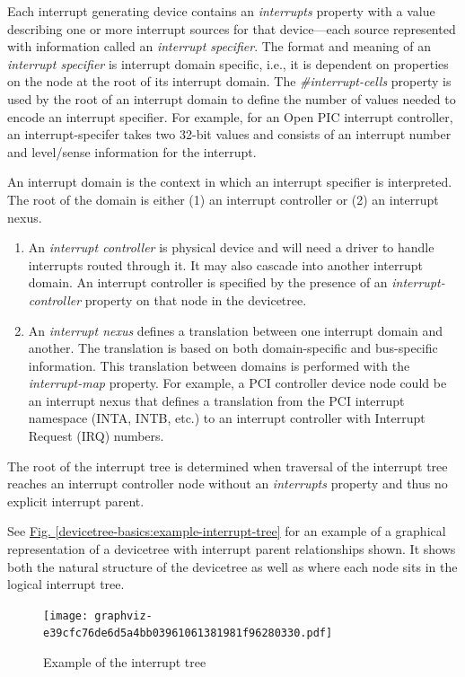\documentclass[a4paper,10pt,oneside]{sphinxmanual}
\begin{document}
Each interrupt generating device contains an \emph{interrupts} property with
a value describing one or more interrupt sources for that device—each
source represented with information called an \emph{interrupt specifier}. The
format and meaning of an \emph{interrupt specifier} is interrupt domain
specific, i.e., it is dependent on properties on the node at the root of
its interrupt domain. The \emph{\#interrupt-cells} property is used by the
root of an interrupt domain to define the number of  values
needed to encode an interrupt specifier. For example, for an Open PIC
interrupt controller, an interrupt-specifer takes two 32-bit values and
consists of an interrupt number and level/sense information for the
interrupt.

An interrupt domain is the context in which an interrupt specifier is
interpreted. The root of the domain is either (1) an interrupt
controller or (2) an interrupt nexus.
\begin{enumerate}
\item {} 
An \emph{interrupt controller} is physical device and will need a driver
to handle interrupts routed through it. It may also cascade into
another interrupt domain. An interrupt controller is specified by the
presence of an \emph{interrupt-controller} property on that node in the
devicetree.

\item {} 
An \emph{interrupt nexus} defines a translation between one interrupt
domain and another. The translation is based on both domain-specific
and bus-specific information. This translation between domains is
performed with the \emph{interrupt-map} property. For example, a PCI
controller device node could be an interrupt nexus that defines a
translation from the PCI interrupt namespace (INTA, INTB, etc.) to an
interrupt controller with Interrupt Request (IRQ) numbers.

\end{enumerate}

The root of the interrupt tree is determined when traversal of the
interrupt tree reaches an interrupt controller node without an
\emph{interrupts} property and thus no explicit interrupt parent.

See \hyperref[devicetree-basics:example-interrupt-tree]{Fig. \ref{devicetree-basics:example-interrupt-tree}} for an example of a graphical
representation of a devicetree with interrupt parent relationships shown. It
shows both the natural structure of the devicetree as well as where each node
sits in the logical interrupt tree.
\begin{figure}[htbp]
\centering
\capstart

\texttt{[image: graphviz-e39cfc76de6d5a4bb03961061381981f96280330.pdf]}
\caption{Example of the interrupt tree}\label{devicetree-basics:example-interrupt-tree}\label{devicetree-basics:id9}\end{figure}
\end{document}
